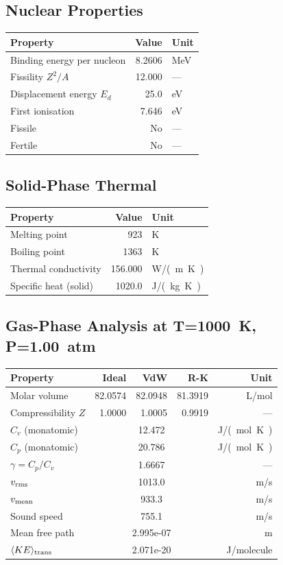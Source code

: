 \documentclass[11pt,a4paper]{article}
\begin{document}
\subsection{Nuclear Properties}
\begin{tabular}{lrl}
  \toprule
  Property & Value & Unit \\
  \midrule
  Binding energy per nucleon & 8.2606 & \si{MeV} \\
  Fissility $Z^2/A$ & 12.000 & --- \\
  Displacement energy $E_d$ & 25.0 & \si{eV} \\
  First ionisation & 7.646 & \si{eV} \\
  Fissile & No & --- \\
  Fertile & No & --- \\
  \bottomrule
\end{tabular}

\subsection{Solid-Phase Thermal}
\begin{tabular}{lrl}
  \toprule
  Property & Value & Unit \\
  \midrule
  Melting point & 923 & \si{K} \\
  Boiling point & 1363 & \si{K} \\
  Thermal conductivity & 156.000 & \si{W/(m.K)} \\
  Specific heat (solid) & 1020.0 & \si{J/(kg.K)} \\
  \bottomrule
\end{tabular}

\subsection{Gas-Phase Analysis at T=\SI{1000}{K}, P=\SI{1.00}{atm}}
\begin{tabular}{lrrrr}
  \toprule
  Property & Ideal & VdW & R-K & Unit \\
  \midrule
  Molar volume & 82.0574 & 82.0948 & 81.3919 & \si{L/mol} \\
  Compressibility $Z$ & 1.0000 & 1.0005 & 0.9919 & --- \\
  \midrule
  $C_v$ (monatomic) & \multicolumn{3}{c}{12.472} & \si{J/(mol.K)} \\
  $C_p$ (monatomic) & \multicolumn{3}{c}{20.786} & \si{J/(mol.K)} \\
  $\gamma = C_p/C_v$ & \multicolumn{3}{c}{1.6667} & --- \\
  $v_{\rm rms}$ & \multicolumn{3}{c}{1013.0} & \si{m/s} \\
  $v_{\rm mean}$ & \multicolumn{3}{c}{933.3} & \si{m/s} \\
  Sound speed & \multicolumn{3}{c}{755.1} & \si{m/s} \\
  Mean free path & \multicolumn{3}{c}{2.995e-07} & \si{m} \\
  $\langle KE \rangle_{\rm trans}$ & \multicolumn{3}{c}{2.071e-20} & \si{J/molecule} \\
  \bottomrule
\end{tabular}
\end{document}
